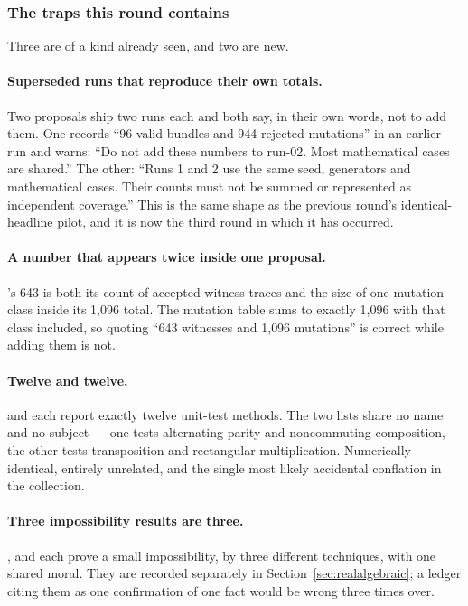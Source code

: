 \subsubsection*{The traps this round contains}

Three are of a kind already seen, and two are new.

\paragraph{Superseded runs that reproduce their own totals.} Two proposals ship
two runs each and both say, in their own words, not to add them. One records
``96 valid bundles and 944 rejected mutations'' in an earlier run and warns:
``Do not add these numbers to run-02. Most mathematical cases are shared.'' The
other: ``Runs 1 and 2 use the same seed, generators and mathematical cases.
Their counts must not be summed or represented as independent coverage.'' This
is the same shape as the previous round's identical-headline pilot, and it is
now the third round in which it has occurred.

\paragraph{A number that appears twice inside one proposal.} 's 643 is
both its count of accepted witness traces and the size of one mutation class
inside its 1{,}096 total. The mutation table sums to exactly 1{,}096 with that
class included, so quoting ``643 witnesses and 1{,}096 mutations'' is correct
while adding them is not.

\paragraph{Twelve and twelve.}  and  each report exactly twelve
unit-test methods. The two lists share no name and no subject --- one tests
alternating parity and noncommuting composition, the other tests transposition
and rectangular multiplication. Numerically identical, entirely unrelated, and
the single most likely accidental conflation in the collection.

\paragraph{Three impossibility results are three.} ,  and
 each prove a small impossibility, by three different techniques, with
one shared moral. They are recorded separately in
Section~\ref{sec:realalgebraic}; a ledger citing them as one confirmation of
one fact would be wrong three times over.

